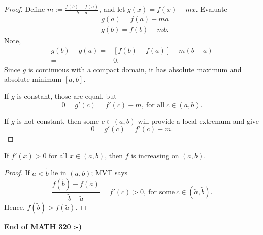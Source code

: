 \begin{proof}
	Define \(m:=\displaystyle\frac{f(b)-f(a)}{b-a}\), and let \(g(x)=f(x)-m x\). Evaluate
	\begin{align*}
		&g(a)=f(a)-m a\\
		&g(b)=f(b)-m b.
	\end{align*}
	Note,
	\begin{align*}
		g(b)-g(a)=&[f(b)-f(a)]-m(b-a)\\
		 		 =&0.
	\end{align*}
	Since \(g\) is continuous with a compact domain, it has absolute maximum and absolute minimum \([a,b]\).
	
	\smallskip
	
	If \(g\) is constant, those are equal, but
	\begin{equation*}
		0=g'(c)=f'(c)-m,~\text{for all}~c\in (a,b).
	\end{equation*}
	
	\smallskip
	
	If \(g\) is not constant, then some \(c\in (a,b)\) will provide a local extremum and give 
	\begin{equation*}
		0=g'(c)=f'(c)-m.
	\end{equation*}
\end{proof}

\begin{corollary}
	If \(f'(x)>0\) for all \(x\in (a,b)\), then \(f\) is increasing on \((a,b)\).
\end{corollary}
\begin{proof}
	If \(\tilde{a}<\tilde{b}\) lie in \((a,b)\); MVT says 
	\begin{equation*}
		\frac{f(\tilde{b})-f(\tilde{a})}{\tilde{b}-\tilde{a}}=f'(c)>0,~\text{for some}~c\in(\tilde{a},\tilde{b}).
	\end{equation*}
	Hence, \(f(\tilde{b})>f(\tilde{a})\).
\end{proof}

\begin{center}
	\textbf{End of MATH 320 :-)}
\end{center}
